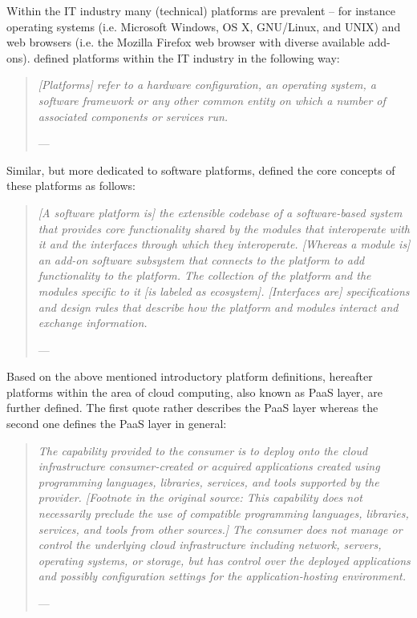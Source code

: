 Within the \ac{IT} industry many (technical) platforms are prevalent -- for instance operating systems (i.e. Microsoft Windows, OS X, GNU/Linux, and UNIX) and web browsers (i.e. the Mozilla Firefox web browser with diverse available add-ons). \citet{Poel2007} defined platforms within the \ac{IT} industry in the following way:

\begin{quotation}{\slshape 
[Platforms] refer to a hardware configuration, an operating system, a software framework or any other common entity on which a number of associated components or services run.}
\vspace*{-7pt}
\begin{flushright}
	--- \citealp[p. 88]{Poel2007}
\end{flushright}
\end{quotation}

Similar, but more dedicated to software platforms, \citet{Tiwana2010} defined the core concepts of these platforms as follows:

\begin{quotation}{\slshape 
[A software platform is] the extensible codebase of a software-based system that provides core functionality shared by the modules that interoperate with it and the interfaces through which they interoperate. [Whereas a module is] an add-on software subsystem that connects to the platform to add functionality to the platform. The collection of the platform and the modules specific to it [is labeled as ecosystem]. [Interfaces are] specifications and design rules that describe how the platform and modules interact and exchange information.}
\vspace*{-7pt}
\begin{flushright}
	--- \citealp[p. 676]{Tiwana2010}
\end{flushright}
\end{quotation}

Based on the above mentioned introductory platform definitions, hereafter platforms within the area of cloud computing, also known as \ac{PaaS} layer, are further defined. The first quote rather describes the \ac{PaaS} layer whereas the second one defines the \ac{PaaS} layer in general:

\begin{quotation}{\slshape 
The capability provided to the consumer is to deploy onto the cloud infrastructure consumer-created or acquired applications created using programming languages, libraries, services, and tools supported by the provider. [Footnote in the original source: This capability does not necessarily preclude the use of compatible programming languages, libraries, services, and tools from other sources.] The consumer does not manage or control the underlying cloud infrastructure including network, servers, operating systems, or storage, but has control over the deployed applications and possibly configuration settings for the application-hosting environment.}
\vspace*{-7pt}
\begin{flushright}
	--- \citealp[pp. 2-3]{Mell2011}
\end{flushright}
\end{quotation}

